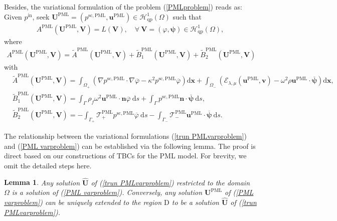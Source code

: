 \documentclass[final,3p,times]{elsarticle}
\newtheorem{lemma}{Lemma}
\begin{document}
Besides, the variational formulation of the problem (\ref{PMLproblem}) reads as: Given $p^\mathrm{in}$, seek ${\boldsymbol{U}}^{\mathrm{PML}}=(p^{\mathrm{sc},\mathrm{PML}}, \boldsymbol{u}^{\mathrm{PML}}) \in \mathscr{H}^1_\mathrm{qp}(\Omega)$ such that
\begin{align}\label{PML varproblem}
	A^{\mathrm{PML}}(\boldsymbol{U}^{\mathrm{PML}}, \boldsymbol{V})
	=L(\boldsymbol{V}), \quad \forall ~ \boldsymbol{V}=(\varphi, \boldsymbol{\psi}) \in \mathscr{H}^1_\mathrm{qp}(\Omega),
\end{align}
where
\begin{align}\label{PML varleft}
	A^{\mathrm{PML}}(\boldsymbol{U}^{\mathrm{PML}}, \boldsymbol{V})
	=\widetilde{A}^{\mathrm{PML}}(\boldsymbol{U}^{\mathrm{PML}}, \boldsymbol{V})
	+\widetilde{B}_1^{\mathrm{PML}}(\boldsymbol{U}^{\mathrm{PML}}, \boldsymbol{V})
	+\widetilde{B}_2^{\mathrm{PML}}(\boldsymbol{U}^{\mathrm{PML}}, \boldsymbol{V})
\end{align}
with
\begin{align*}
	&\widetilde{A}^{\mathrm{PML}}(\boldsymbol{U}^{\mathrm{PML}}, \boldsymbol{V})
	= \int_{\Omega_+}\left(\nabla p^{\mathrm{sc},\mathrm{PML}} \cdot \nabla \overline{\varphi}-\kappa^2 p^{\mathrm{sc},\mathrm{PML}} \overline{\varphi}\right) \mathrm{d} \boldsymbol{x}
	+ \int_{\Omega_-}\left(\mathcal{E}_{\lambda, \mu}(\boldsymbol{u}^\mathrm{PML}, \boldsymbol{v})- \omega^2\rho \boldsymbol{u}^\mathrm{PML} \cdot \overline{\boldsymbol{\psi}}\right) \mathrm{d} \boldsymbol{x},\\
	&\widetilde{B}_1^{\mathrm{PML}}(\boldsymbol{U}^{\mathrm{PML}}, \boldsymbol{V})
	= \int_{\Gamma} \rho_f \omega^2 \boldsymbol{u}^\mathrm{PML} \cdot \boldsymbol{n} \overline{\varphi} \mathrm{~d}s + \int_{\Gamma} p^{\mathrm{sc},\mathrm{PML}} \boldsymbol{n} \cdot \overline{\boldsymbol{\psi}} \mathrm{~d}s, \\
	&\widetilde{B}_2^{\mathrm{PML}}(\boldsymbol{U}^{\mathrm{PML}}, \boldsymbol{V})=
	- \int_{\Gamma_+} \mathscr{T}_+^\mathrm{PML} p^{\mathrm{sc},\mathrm{PML}} \overline{\varphi} \mathrm{~d}s - \int_{\Gamma_-} \mathscr{T}_-^\mathrm{PML} \boldsymbol{u}^\mathrm{PML} \cdot \overline{\boldsymbol{\psi}} \mathrm{~d}s.
\end{align*}

The relationship between the variational formulations (\ref{trun PMLvarproblem}) and (\ref{PML varproblem}) can be established via the following lemma. The proof is direct based on our constructions of TBCs for the PML model. For brevity, we omit the detailed steps here.
\begin{lemma}
	Any solution $\hat{\boldsymbol{U}}$ of (\ref{trun PMLvarproblem}) restricted to the domain $\Omega$ is a solution of (\ref{PML varproblem}). Conversely, any solution $\boldsymbol{U}^\mathrm{PML}$ of (\ref{PML varproblem}) can be uniquely extended to the region $\mathrm{D}$ to be a solution $\hat{\boldsymbol{U}}$ of (\ref{trun PMLvarproblem}).
\end{lemma}
\end{document}
